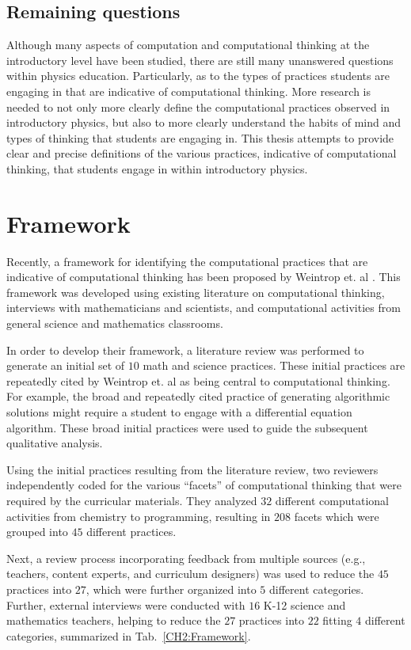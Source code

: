 \documentclass{msuphddissertation}
\begin{document}
\begin{doublespace}
\subsection{Remaining questions}

Although many aspects of computation and computational thinking at the introductory level have been studied, there are still many unanswered questions within physics education.  Particularly, as to the types of practices students are engaging in that are indicative of computational thinking.  More research is needed to not only more clearly define the computational practices observed in introductory physics, but also to more clearly understand the habits of mind and types of thinking that students are engaging in.  This thesis attempts to provide clear and precise definitions of the various practices, indicative of computational thinking, that students engage in within introductory physics.

\section{Framework}

Recently, a framework for identifying the computational practices that are indicative of computational thinking has been proposed by Weintrop et. al \cite{Weintrop2015}.  This framework was developed using existing literature on computational thinking, interviews with mathematicians and scientists, and computational activities from general science and mathematics classrooms.

In order to develop their framework, a literature review was performed to generate an initial set of $10$ math and science practices.  These initial practices are repeatedly cited by Weintrop et. al as being central to computational thinking.  For example, the broad and repeatedly cited practice of generating algorithmic solutions might require a student to engage with a differential equation algorithm.  These broad initial practices were used to guide the subsequent qualitative analysis.

Using the initial practices resulting from the literature review, two reviewers independently coded for the various ``facets'' of computational thinking that were required by the curricular materials.  They analyzed $32$ different computational activities from chemistry to programming, resulting in $208$ facets which were grouped into $45$ different practices.

Next, a review process incorporating feedback from multiple sources (e.g., teachers, content experts, and curriculum designers) was used to reduce the $45$ practices into $27$, which were further organized into $5$ different categories.  Further, external interviews were conducted with $16$ K-12 science and mathematics teachers, helping to reduce the $27$ practices into $22$ fitting $4$ different categories, summarized in Tab.~\ref{CH2:Framework}.


\end{doublespace}
\end{document}
